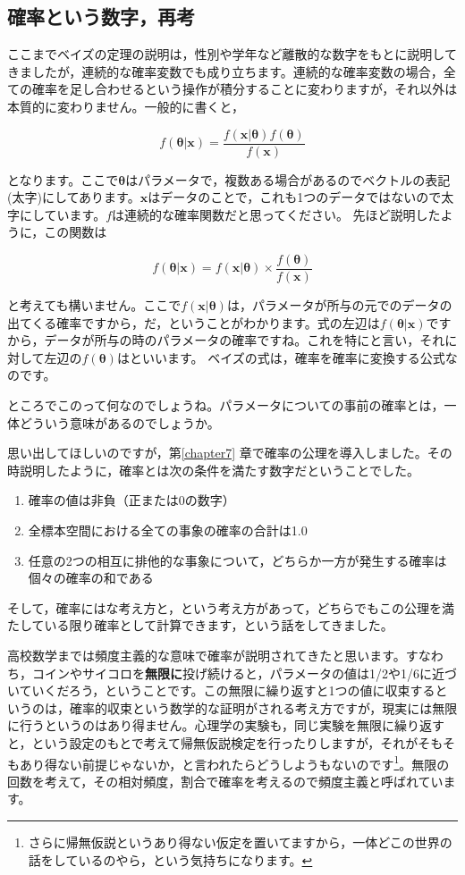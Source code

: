 \documentclass{ltjbook}
\begin{document}
\subsection{確率という数字，再考}
ここまでベイズの定理の説明は，性別や学年など離散的な数字をもとに説明してきましたが，連続的な確率変数でも成り立ちます。連続的な確率変数の場合，全ての確率を足し合わせるという操作が積分することに変わりますが，それ以外は本質的に変わりません。一般的に書くと，

\[ f(\bm{\theta}|\bm{x}) = \frac{f(\bm{x}|\bm{\theta})f(\bm{\theta})}{f(\bm{x})} \]

となります。ここで$\bm{\theta}$はパラメータで，複数ある場合があるのでベクトルの表記(太字)にしてあります。$\bm{x}$はデータのことで，これも1つのデータではないので太字にしています。$f$は連続的な確率関数だと思ってください。
先ほど説明したように，この関数は

\[ f(\bm{\theta}|\bm{x}) = f(\bm{x}|\bm{\theta}) \times \frac{f(\bm{\theta})}{f(\bm{x})} \]

と考えても構いません。ここで$f(\bm{x}|\bm{\theta})$は，パラメータが所与の元でのデータの出てくる確率ですから，だ，ということがわかります。式の左辺は$ f(\bm{\theta}|\bm{x})$ですから，データが所与の時のパラメータの確率ですね。これを特にと言い，それに対して左辺の$f(\bm{\theta})$はといいます。
ベイズの式は，確率を確率に変換する公式なのです。

ところでこのって何なのでしょうね。パラメータについての事前の確率とは，一体どういう意味があるのでしょうか。

思い出してほしいのですが，第\ref{chapter7} 章で確率の公理を導入しました。その時説明したように，確率とは次の条件を満たす数字だということでした。
\begin{enumerate}
    \item 確率の値は非負（正または0の数字）
    \item 全標本空間における全ての事象の確率の合計は1.0
    \item 任意の2つの相互に排他的な事象について，どちらか一方が発生する確率は個々の確率の和である
\end{enumerate}
そして，確率にはな考え方と，という考え方があって，どちらでもこの公理を満たしている限り確率として計算できます，という話をしてきました。

高校数学までは頻度主義的な意味で確率が説明されてきたと思います。すなわち，コインやサイコロを\textbf{無限に}投げ続けると，パラメータの値は1/2や1/6に近づいていくだろう，ということです。この無限に繰り返すと1つの値に収束するというのは，確率的収束という数学的な証明がされる考え方ですが，現実には無限に行うというのはあり得ません。心理学の実験も，同じ実験を無限に繰り返すと，という設定のもとで考えて帰無仮説検定を行ったりしますが，それがそもそもあり得ない前提じゃないか，と言われたらどうしようもないのです\footnote{さらに帰無仮説というあり得ない仮定を置いてますから，一体どこの世界の話をしているのやら，という気持ちになります。}。無限の回数を考えて，その相対頻度，割合で確率を考えるので頻度主義と呼ばれています。
\end{document}
